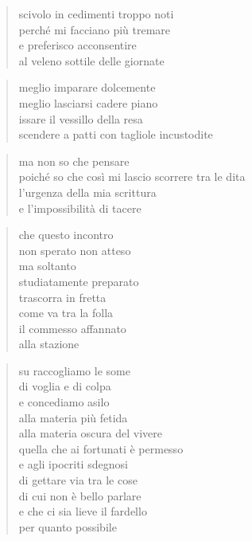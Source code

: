 \begin{poem}
\begin{poem}
	\begin{verse}
		scivolo in cedimenti troppo noti\\
		perché mi facciano più tremare\\
		e preferisco acconsentire\\
		al veleno sottile delle giornate
	\end{verse}

	\begin{verse}
		meglio imparare dolcemente\\
		meglio lasciarsi cadere piano\\
		issare il vessillo della resa\\
		scendere a patti con tagliole incustodite
	\end{verse}

	\begin{verse}
		ma non so che pensare\\
		poiché so che così mi lascio scorrere tra le dita\\
		l'urgenza della mia scrittura\\
		e l'impossibilità di tacere
	\end{verse}

\clearpage


	\begin{verse}
		che questo incontro\\
		non sperato non atteso\\
		ma soltanto\\
		studiatamente preparato\\
		trascorra in fretta\\
		come va tra la folla\\
		il commesso affannato\\
		alla stazione
	\end{verse}

\clearpage


	\begin{verse}
		su raccogliamo le some\\
		di voglia e di colpa\\
		e concediamo asilo\\
		alla materia più fetida\\
		alla materia oscura del vivere\\
		quella che ai fortunati è permesso\\
		e agli ipocriti sdegnosi\\
		di gettare via tra le cose\\
		di cui non è bello parlare\\
		e che ci sia lieve il fardello\\
		per quanto possibile
	\end{verse}


\end{poem}
\end{poem}
